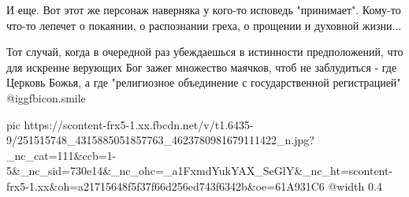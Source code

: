 И еще. Вот этот же персонаж наверняка у кого-то исповедь "принимает". Кому-то
что-то лепечет о покаянии, о распознании греха, о прощении и духовной жизни...

Тот случай, когда в очередной раз убеждаешься в истинности предположений, что
для искренне верующих Бог зажег множество маячков, чтоб не заблудиться - где
Церковь Божья, а где "религиозное объединение с государственной регистрацией"
 @igg{fbicon.smile} 

\ifcmt
  pic https://scontent-frx5-1.xx.fbcdn.net/v/t1.6435-9/251515748_4315885051857763_4623780981679111422_n.jpg?_nc_cat=111&ccb=1-5&_nc_sid=730e14&_nc_ohc=_a1FxmdYukYAX_SeGlY&_nc_ht=scontent-frx5-1.xx&oh=a21715648f5f37f66d256ed743f6342b&oe=61A931C6
  @width 0.4
\fi
